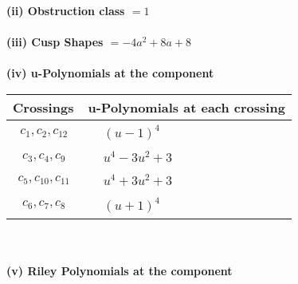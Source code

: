 \documentclass[1p]{elsarticle_modified}
\theoremstyle{definition}
\begin{document}
\flushleft \textbf{(ii) Obstruction class $= 1$}\\~\\
\flushleft \textbf{(iii) Cusp Shapes $= -4 a^2+8 a+8$}\\~\\
\newpage\renewcommand{\arraystretch}{1}
\flushleft \textbf{(iv) u-Polynomials at the component}\newline \\
\begin{tabular}{m{50pt}|m{274pt}}
Crossings & \hspace{64pt}u-Polynomials at each crossing \\
\hline $$\begin{aligned}c_{1},c_{2},c_{12}\end{aligned}$$&$\begin{aligned}
&(u-1)^4
\end{aligned}$\\
\hline $$\begin{aligned}c_{3},c_{4},c_{9}\end{aligned}$$&$\begin{aligned}
&u^4-3 u^2+3
\end{aligned}$\\
\hline $$\begin{aligned}c_{5},c_{10},c_{11}\end{aligned}$$&$\begin{aligned}
&u^4+3 u^2+3
\end{aligned}$\\
\hline $$\begin{aligned}c_{6},c_{7},c_{8}\end{aligned}$$&$\begin{aligned}
&(u+1)^4
\end{aligned}$\\
\hline
\end{tabular}\\~\\
\newpage\renewcommand{\arraystretch}{1}
\flushleft \textbf{(v) Riley Polynomials at the component}\newline \\
\end{document}
